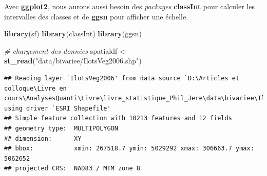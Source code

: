 \documentclass[
  11pt,
  french,
]{book}
\makeatletter
\newenvironment{Shaded}{\begin{snugshade}}{\end{snugshade}}
\newcommand{\CommentTok}[1]{\textcolor[rgb]{0.56,0.35,0.01}{\textit{#1}}}
\newcommand{\KeywordTok}[1]{\textcolor[rgb]{0.13,0.29,0.53}{\textbf{#1}}}
\newcommand{\NormalTok}[1]{#1}
\newcommand{\StringTok}[1]{\textcolor[rgb]{0.31,0.60,0.02}{#1}}
\newenvironment{kframe}{%
\medskip{}
\setlength{\fboxsep}{.8em}
 \def\at@end@of@kframe{}%
 \ifinner\ifhmode%
  \def\at@end@of@kframe{\end{minipage}}%
  \begin{minipage}{\columnwidth}%
 \fi\fi%
 \def\FrameCommand##1{\hskip\@totalleftmargin \hskip-\fboxsep
 \colorbox{shadecolor}{##1}\hskip-\fboxsep
     \hskip-\linewidth \hskip-\@totalleftmargin \hskip\columnwidth}%
 \MakeFramed {\advance\hsize-\width
   \@totalleftmargin\z@ \linewidth\hsize
   \@setminipage}}%
 {\par\unskip\endMakeFramed%
 \at@end@of@kframe}
\renewenvironment{Shaded}{\begin{kframe}}{\end{kframe}}
\makeatother
\begin{document}
Avec \textbf{ggplot2}, nous aurons aussi besoin des \emph{packages} \textbf{classInt} pour calculer les intervalles des classes et de \textbf{ggsn} pour afficher une échelle.

\begin{Shaded}
\begin{Highlighting}[]
\KeywordTok{library}\NormalTok{(sf)}
\KeywordTok{library}\NormalTok{(classInt)}
\KeywordTok{library}\NormalTok{(ggsn)}

\CommentTok{# chargement des données}
\NormalTok{spatialdf <-}\StringTok{ }\KeywordTok{st_read}\NormalTok{(}\StringTok{"data/bivariee/IlotsVeg2006.shp"}\NormalTok{)}
\end{Highlighting}
\end{Shaded}

\begin{verbatim}
## Reading layer `IlotsVeg2006' from data source `D:\Articles et colloque\Livre en cours\AnalysesQuanti\Livre\livre_statistique_Phil_Jere\data\bivariee\IlotsVeg2006.shp' using driver `ESRI Shapefile'
## Simple feature collection with 10213 features and 12 fields
## geometry type:  MULTIPOLYGON
## dimension:      XY
## bbox:           xmin: 267518.7 ymin: 5029292 xmax: 306663.7 ymax: 5062652
## projected CRS:  NAD83 / MTM zone 8
\end{verbatim}
\end{document}
